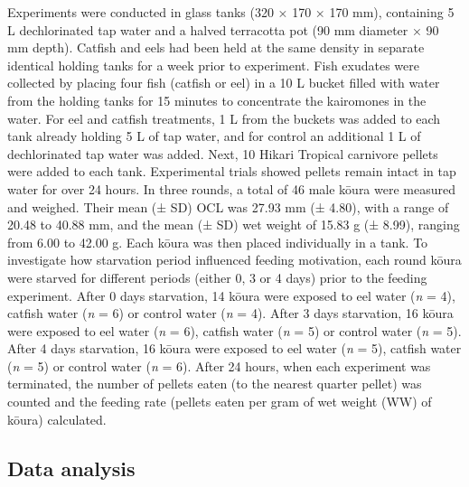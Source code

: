 \documentclass[
  12pt,
  a4paper,
  oneside]{scrbook}
\begin{document}
Experiments were conducted in glass tanks (320 × 170 × 170 mm),
containing 5 L dechlorinated tap water and a halved terracotta pot (90
mm diameter × 90 mm depth). Catfish and eels had been held at the same
density in separate identical holding tanks for a week prior to
experiment. Fish exudates were collected by placing four fish (catfish
or eel) in a 10 L bucket filled with water from the holding tanks for 15
minutes to concentrate the kairomones in the water. For eel and catfish
treatments, 1 L from the buckets was added to each tank already holding
5 L of tap water, and for control an additional 1 L of dechlorinated tap
water was added. Next, 10 Hikari Tropical carnivore pellets were added
to each tank. Experimental trials showed pellets remain intact in tap
water for over 24 hours. In three rounds, a total of 46 male kōura were
measured and weighed. Their mean (± SD) OCL was 27.93 mm (± 4.80), with
a range of 20.48 to 40.88 mm, and the mean (± SD) wet weight of 15.83 g
(± 8.99), ranging from 6.00 to 42.00 g. Each kōura was then placed
individually in a tank. To investigate how starvation period influenced
feeding motivation, each round kōura were starved for different periods
(either 0, 3 or 4 days) prior to the feeding experiment. After 0 days
starvation, 14 kōura were exposed to eel water (\emph{n} = 4), catfish
water (\emph{n} = 6) or control water (\emph{n} = 4). After 3 days
starvation, 16 kōura were exposed to eel water (\emph{n} = 6), catfish
water (\emph{n} = 5) or control water (\emph{n} = 5). After 4 days
starvation, 16 kōura were exposed to eel water (\emph{n} = 5), catfish
water (\emph{n} = 5) or control water (\emph{n} = 6). After 24 hours,
when each experiment was terminated, the number of pellets eaten (to the
nearest quarter pellet) was counted and the feeding rate (pellets eaten
per gram of wet weight (WW) of kōura) calculated.

\subsection{Data analysis}\label{data-analysis}
\end{document}
